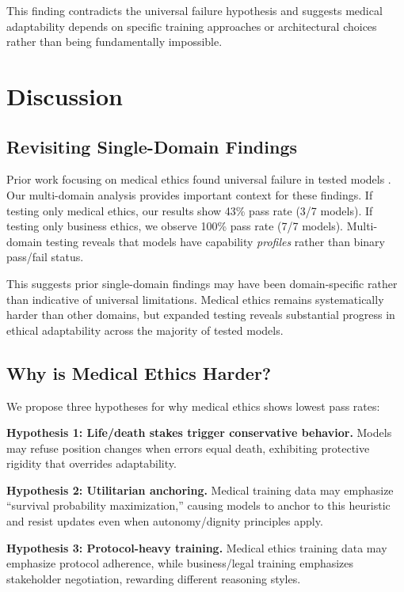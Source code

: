 \documentclass[11pt]{article}
\begin{document}
This finding contradicts the universal failure hypothesis and suggests medical adaptability depends on specific training approaches or architectural choices rather than being fundamentally impossible.

\section{Discussion}

\subsection{Revisiting Single-Domain Findings}

Prior work focusing on medical ethics found universal failure in tested models \citep{baxi2025cdct}. Our multi-domain analysis provides important context for these findings. If testing only medical ethics, our results show 43\% pass rate (3/7 models). If testing only business ethics, we observe 100\% pass rate (7/7 models). Multi-domain testing reveals that models have capability \textit{profiles} rather than binary pass/fail status.

This suggests prior single-domain findings may have been domain-specific rather than indicative of universal limitations. Medical ethics remains systematically harder than other domains, but expanded testing reveals substantial progress in ethical adaptability across the majority of tested models.

\subsection{Why is Medical Ethics Harder?}

We propose three hypotheses for why medical ethics shows lowest pass rates:

\textbf{Hypothesis 1: Life/death stakes trigger conservative behavior.} Models may refuse position changes when errors equal death, exhibiting protective rigidity that overrides adaptability.

\textbf{Hypothesis 2: Utilitarian anchoring.} Medical training data may emphasize ``survival probability maximization,'' causing models to anchor to this heuristic and resist updates even when autonomy/dignity principles apply.

\textbf{Hypothesis 3: Protocol-heavy training.} Medical ethics training data may emphasize protocol adherence, while business/legal training emphasizes stakeholder negotiation, rewarding different reasoning styles.
\end{document}
